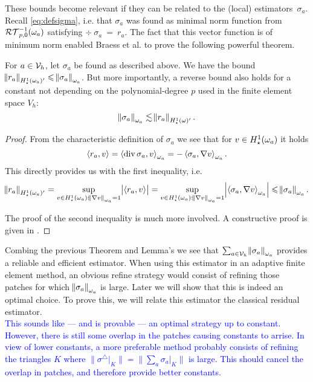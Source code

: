 \documentclass[thesis.tex]{subfiles}
\begin{document}
These bounds become relevant if they can be related to the (local) estimators~$\sigma_a$. Recall \eqref{eq:defsigma}, i.e.
that $\sigma_a$ was found as minimal norm function from $\mathcal{RT}_{p,0}^{-1}(\omega_a)$ satisfying $\div~\sigma_a~=~r_a$.
The fact that this vector function is of minimum norm enabled Braess et al. \cite{braessequilrobust} to prove the following powerful theorem.
\begin{thm}
  \label{thm:locresequiv}
  For $a \in \mathcal{V}_h$, let $\sigma_a$ be found as described above. 
  We have the bound $\norm{r_a}_{H_\star^1(\omega_a)'} \leqslant \norm{\sigma_a}_{\omega_a}$. But more importantly,
  a reverse bound also holds for a constant {not} depending on the polynomial-degree $p$ used in the finite element space $V_h$:
  \[
    \norm{\sigma_a}_{\omega_a} \lesssim \norm{r_a}_{H_\star^1(\omega)'}.
  \]
\end{thm}
\begin{proof}
  From the characteristic definition of $\sigma_a$ we see that for $v \in H_\star^1(\omega_a)$ it holds
  \[
    \left \langle r_a, v \right \rangle = \left \langle \operatorname{div} \sigma_a, v \right \rangle_{\omega_a} = - \left \langle \sigma_a, \nabla v \right \rangle_{\omega_a}.
  \]
  This directly provides us with the first inequality, i.e.
  \[
    \norm{r_a}_{H_\star^1(\omega_a)'} = \sup_{v \in H_\star^1(\omega_a) : \norm{\nabla v}_{\omega_a} = 1} \abs{\left \langle r_a, v \right \rangle} = \sup_{v \in H_\star^1(\omega_a) : \norm{\nabla v}_{\omega_a}=1} \abs{\left \langle \sigma_a, \nabla v \right \rangle_{\omega_a}} \leqslant \norm{\sigma_a}_{\omega_a}.
  \]

  The proof of the second inequality is much more involved. A constructive proof is given in \cite[Theorem~7]{braessequilrobust}.
\end{proof}
\begin{rem}
  Combing the previous Theorem and Lemma's we see that $\sum_{a \in \mathcal{V}_h} \norm{\sigma_a}_{\omega_a}$ provides a reliable and efficient estimator.
  When using this estimator in an adaptive finite element method, an obvious refine strategy would consist
  of refining those patches for which $\norm{\sigma_a}_{\omega_a}$ is large. Later we will show that this is indeed
  an optimal choice. To prove this, we will relate this estimator the classical residual estimator.
  \\
  \textcolor{blue}{
    This sounds like --- and is provable --- an optimal strategy up to constant. However, there is still some 
    overlap in the patches causing constants to arrise. In view of lower constants, a more preferable method probably consists of refining the triangles $K$
    where $\|{\sigma^\triangle|_{K}}\| =\|{\sum_{a} \sigma_a|_{K}}\|$ is large. This should cancel the overlap in patches,
    and therefore provide better constants.
  }
\end{rem}
\end{document}
